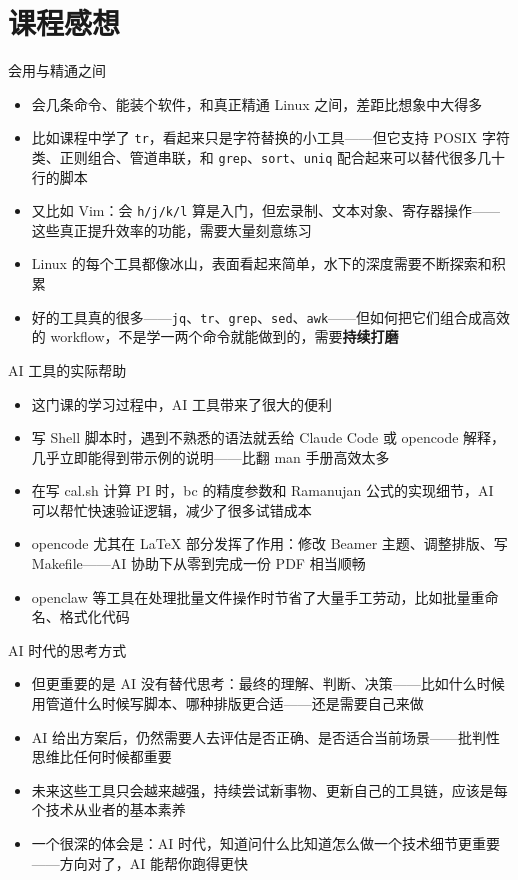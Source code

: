 \section{课程感想}

\begin{frame}{会用与精通之间}
\begin{itemize}
  \item 会几条命令、能装个软件，和真正精通 Linux 之间，差距比想象中大得多
  \item 比如课程中学了 \texttt{tr}，看起来只是字符替换的小工具——但它支持 POSIX 字符类、正则组合、管道串联，和 \texttt{grep}、\texttt{sort}、\texttt{uniq} 配合起来可以替代很多几十行的脚本
  \item 又比如 Vim：会 \texttt{h/j/k/l} 算是入门，但宏录制、文本对象、寄存器操作——这些真正提升效率的功能，需要大量刻意练习
  \item Linux 的每个工具都像冰山，表面看起来简单，水下的深度需要不断探索和积累
  \item 好的工具真的很多——\texttt{jq}、\texttt{tr}、\texttt{grep}、\texttt{sed}、\texttt{awk}——但如何把它们组合成高效的 workflow，不是学一两个命令就能做到的，需要\textbf{持续打磨}
\end{itemize}
\end{frame}

\begin{frame}{AI 工具的实际帮助}
\begin{itemize}
  \item 这门课的学习过程中，AI 工具带来了很大的便利
  \item 写 Shell 脚本时，遇到不熟悉的语法就丢给 Claude Code 或 opencode 解释，几乎立即能得到带示例的说明——比翻 man 手册高效太多
  \item 在写 cal.sh 计算 PI 时，bc 的精度参数和 Ramanujan 公式的实现细节，AI 可以帮忙快速验证逻辑，减少了很多试错成本
  \item opencode 尤其在 LaTeX 部分发挥了作用：修改 Beamer 主题、调整排版、写 Makefile——AI 协助下从零到完成一份 PDF 相当顺畅
  \item openclaw 等工具在处理批量文件操作时节省了大量手工劳动，比如批量重命名、格式化代码
\end{itemize}
\end{frame}

\begin{frame}{AI 时代的思考方式}
\begin{itemize}
  \item 但更重要的是 AI 没有替代思考：最终的理解、判断、决策——比如什么时候用管道什么时候写脚本、哪种排版更合适——还是需要自己来做
  \item AI 给出方案后，仍然需要人去评估是否正确、是否适合当前场景——批判性思维比任何时候都重要
  \item 未来这些工具只会越来越强，持续尝试新事物、更新自己的工具链，应该是每个技术从业者的基本素养
  \item 一个很深的体会是：AI 时代，知道问什么比知道怎么做一个技术细节更重要——方向对了，AI 能帮你跑得更快
\end{itemize}
\end{frame}

